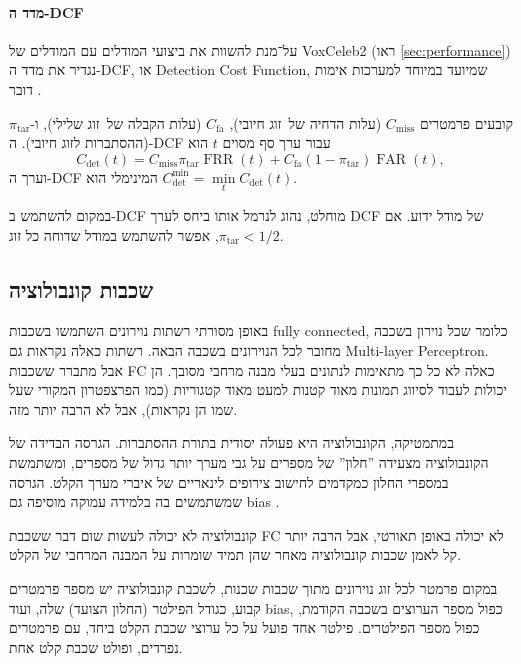 \documentclass[hebrew, a4paper]{article}
\theoremstyle{plain}
\theoremstyle{definition}
\numberwithin{equation}{section}
\DeclareMathOperator\FAR{FAR}
\DeclareMathOperator\FRR{FRR}
\begin{document}
\paragraph{מדד ה-DCF}

על־מנת להשוות את ביצועי המודלים עם המודלים של VoxCeleb2 (ראו
\autoref{sec:performance}) נגדיר את מדד ה-DCF, או Detection Cost
Function, שמיועד במיוחד למערכות אימות דובר .

קובעים פרמטרים $C_{\mathrm{miss}}$ (עלות הדחיה של~זוג חיובי),
$C_{\mathrm{fa}}$ (עלות הקבלה של~זוג שלילי), ו-$\pi_{\mathrm{tar}}$
(ההסתברות לזוג חיובי). ה-DCF עבור ערך סף מסוים $t$ הוא
\begin{equation}
  \label{eq:dcf}
  C_{\mathrm{det}}(t) = C_{\mathrm{miss}} \pi_{\mathrm{tar}} \FRR(t) + C_{\mathrm{fa}}(1 - \pi_{\mathrm{tar}}) \FAR(t),
\end{equation}
וערך ה-DCF המינימלי הוא $C^{\mathrm{min}}_{\mathrm{det}} = \min\limits_{t} C_{\mathrm{det}}(t)$.

במקום להשתמש ב-DCF מוחלט, נהוג לנרמל אותו ביחס לערך DCF של מודל ידוע.
אם $\pi_{\mathrm{tar}} < 1/2$, אפשר להשתמש במודל שדוחה כל זוג.

\subsection{שכבות קונבולוציה}
\label{sec:convolution}

באופן מסורתי רשתות נוירונים השתמשו בשכבות fully connected, כלומר שכל
נוירון בשכבה מחובר לכל הנוירונים בשכבה הבאה. רשתות כאלה נקראות גם
Multi-layer Perceptron. אבל מתברר ששכבות FC כאלה לא כל כך מתאימות
לנתונים בעלי מבנה מרחבי מסובך. הן יכולות לעבוד לסיווג תמונות מאוד
קטנות למעט מאוד קטגוריות (כמו הפרצפטרון המקורי שעל שמו הן נקראות), אבל
לא הרבה יותר מזה.

במתמטיקה, הקונבולוציה היא פעולה יסודית בתורת ההסתברות. הגרסה הבדידה של
הקונבולוציה מצעידה ”חלון” של מספרים על גבי מערך יותר גדול של מספרים,
ומשתמשת במספרי החלון כמקדמים לחישוב צירופים לינאריים של איברי מערך
הקלט. הגרסה שמשתמשים בה בלמידה עמוקה מוסיפה גם bias .

קונבולוציה לא יכולה לעשות שום דבר ששכבת FC לא יכולה באופן תאורטי, אבל
הרבה יותר קל לאמן שכבות קונבולוציה מאחר שהן תמיד שומרות על המבנה
המרחבי של הקלט.

במקום פרמטר לכל זוג נוירונים מתוך שכבות שכנות, לשכבת קונבולוציה יש
מספר פרמטרים קבוע, כגודל הפילטר (החלון הצועד) שלה, ועוד bias, כפול
מספר הערוצים בשכבה הקודמת, כפול מספר הפילטרים. פילטר אחד פועל על כל
ערוצי שכבת הקלט ביחד, עם פרמטרים נפרדים, ופולט שכבת קלט אחת.
\end{document}
